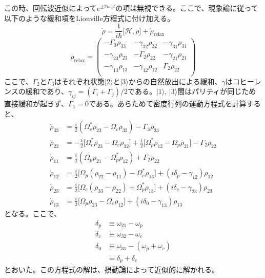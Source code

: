 \documentclass[dvipdfmx]{jsreport}
\begin{document}
この時、回転波近似によって$e^{\pm 2i\omega_c t}$の項は無視できる。ここで、現象論に従って以下のような緩和項をLiouville方程式に付け加える。
\begin{equation}
    \dot{\rho} = \frac{1}{i\hbar} \lbrack \mathcal{H}, \rho \rbrack + \dot{\rho}_{\text{relax}}
\end{equation}
\begin{equation}
    \dot{\rho}_{\text{relax}} = 
    \begin{pmatrix} 
        -\Gamma_3 \rho_{33} & -\gamma_{32}\rho_{32}  & -\gamma_{31}\rho_{31}  \\
        -\gamma_{23}\rho_{23} & -\Gamma_2 \rho_{22}  &  -\gamma_{21} \rho_{21}  \\
        -\gamma_{13}\rho_{13} & -\gamma_{12} \rho_{12} & \Gamma_2 \rho_{22} \\
    \end{pmatrix}
\end{equation}
ここで、$\Gamma_2$と$\Gamma_3$はそれぞれ状態$| 2 \rangle$と$| 3 \rangle$からの自然放出による緩和、$\gamma$はコヒーレンスの緩和であり、$\gamma_{ij} = (\Gamma_i + \Gamma_j) / 2$である。$| 1 \rangle$, $| 3 \rangle$間はパリティが同じため直接緩和が起きず、$\Gamma_1 = 0$である。あらためて密度行列の運動方程式を計算すると、
\begin{align}
\label{dot-rho-33}
{\dot{\rho}_{33}} &= \frac{i}{2} \left( \Omega_c^* {\rho_{23}} - \Omega_c{\rho_{32}} \right) - \Gamma_3 \rho_{33} \\
{\dot{\rho}_{22}} &= -\frac{i}{2} \lbrack \Omega_c^* {\rho_{23}} - \Omega_c{\rho_{32}} \rbrack + \frac{i}{2} \lbrack \Omega_p^* {\rho_{12}} - \Omega_p{\rho_{21}} \rbrack - \Gamma_2 \rho_{22} \\
{\dot{\rho}_{11}} &= \frac{i}{2} \left( \Omega_p {\rho_{21}} - \Omega_p^*{\rho_{12}} \right) + \Gamma_2 \rho_{22} \\
{\dot{\rho}_{12}} &= \frac{i}{2} \lbrack \Omega_p (\rho_{22} - \rho_{11}) - \Omega_c^* \rho_{13} \rbrack + \left( i\delta_p -\gamma_{12} \right) \rho_{12} \\
{\dot{\rho}_{23}} &= \frac{i}{2} \lbrack \Omega_c (\rho_{33} - \rho_{22}) + \Omega_p^* \rho_{13} \rbrack + \left( i\delta_c -\gamma_{23} \right) \rho_{23} \\
\label{dot-rho-11}
{\dot{\rho}_{13}} &= \frac{i}{2} \lbrack \Omega_p \rho_{23} - \Omega_c \rho_{12} \rbrack + \left( i\delta_0 -\gamma_{13} \right) \rho_{13}
\end{align}
となる。ここで、
\begin{equation}
\begin{split}
    \delta_p &\equiv \omega_{21} - \omega_p \\
    \delta_c &\equiv \omega_{32} - \omega_c \\
    \delta_0 &\equiv \omega_{31} - (\omega_p + \omega_c) \\
    &= \delta_p + \delta_c
\end{split}
\end{equation}
とおいた。この方程式の解は、摂動論によって近似的に解かれる。
\end{document}
